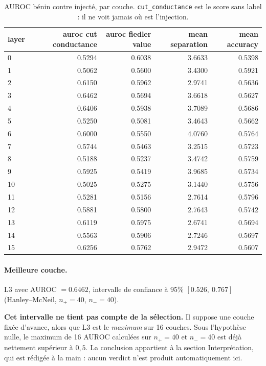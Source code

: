 \documentclass[11pt,a4paper]{article}
\begin{document}
\begin{table}[htbp]
\centering
\small
\begin{tabular}{lrrrr}
\hline
layer & auroc cut conductance & auroc fiedler value & mean separation & mean accuracy \\
\hline
0 & 0.5294 & 0.6038 & 3.6633 & 0.5398 \\
1 & 0.5062 & 0.5600 & 3.4300 & 0.5921 \\
2 & 0.6150 & 0.5962 & 2.9741 & 0.5636 \\
3 & 0.6462 & 0.5694 & 3.6618 & 0.5627 \\
4 & 0.6406 & 0.5938 & 3.7089 & 0.5686 \\
5 & 0.5250 & 0.5081 & 3.4643 & 0.5662 \\
6 & 0.6000 & 0.5550 & 4.0760 & 0.5764 \\
7 & 0.5744 & 0.5463 & 3.2515 & 0.5723 \\
8 & 0.5188 & 0.5237 & 3.4742 & 0.5759 \\
9 & 0.5925 & 0.5419 & 3.9685 & 0.5734 \\
10 & 0.5025 & 0.5275 & 3.1440 & 0.5756 \\
11 & 0.5281 & 0.5156 & 2.7614 & 0.5796 \\
12 & 0.5881 & 0.5800 & 2.7643 & 0.5742 \\
13 & 0.6119 & 0.5975 & 2.6741 & 0.5694 \\
14 & 0.5563 & 0.5906 & 2.7246 & 0.5697 \\
15 & 0.6256 & 0.5762 & 2.9472 & 0.5607 \\
\hline
\end{tabular}
\caption{AUROC bénin contre injecté, par couche. \texttt{cut\_conductance} est le score sans label : il ne voit jamais où est l'injection.}
\label{tab:layers}
\end{table}


\paragraph{Meilleure couche.} L3 avec
AUROC $= 0.6462$, intervalle de confiance à 95\%
$[0.526,\ 0.767]$ (Hanley--McNeil, $n_+ = 40$, $n_- = 40$).



\textbf{Cet intervalle ne tient pas compte de la sélection.} Il suppose une
couche fixée d'avance, alors que L3 est le \emph{maximum} sur
16 couches. Sous l'hypothèse nulle, le maximum de
16 AUROC calculées sur $n_+ = 40$ et $n_- = 40$ est déjà
nettement supérieur à $0{,}5$. La conclusion appartient à la section
Interprétation, qui est rédigée à la main : aucun verdict n'est produit
automatiquement ici.
\end{document}
